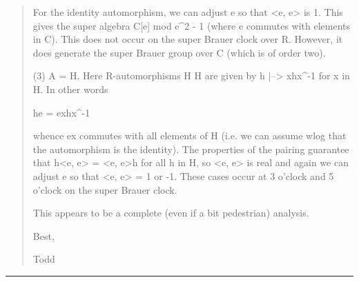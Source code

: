 \begin{quote}
For the identity automorphism, we can adjust e so that  <e, e>
is 1.  This gives the super algebra  C[e] mod e^{2} - 1  (where e 
commutes with elements in C).  This does not occur on the 
super Brauer clock over R.  However, it does generate the super 
Brauer group over C (which is of order two). 
 
(3)  A = H.  Here R-automorphisms  H \to  H  are given by 
h |--> xhx^{-1}  for x in H.  In other words 
 
                     he = exhx^{-1}
 
whence  ex  commutes with all elements of H (i.e. we can 
assume wlog that the automorphism is the identity).  The 
properties of the pairing guarantee that  h<e, e> = <e, e>h 
for all h in H, so  <e, e>  is real and again we can adjust 
e so that  <e, e> = 1 or -1.  These cases occur at 3 o'clock 
and 5 o'clock on the super Brauer clock. 
 
This appears to be a complete (even if a bit pedestrian) 
analysis. 
 
Best, 
 
Todd
$$
    
\end{quote}




\par\noindent\rule{\textwidth}{0.4pt}
